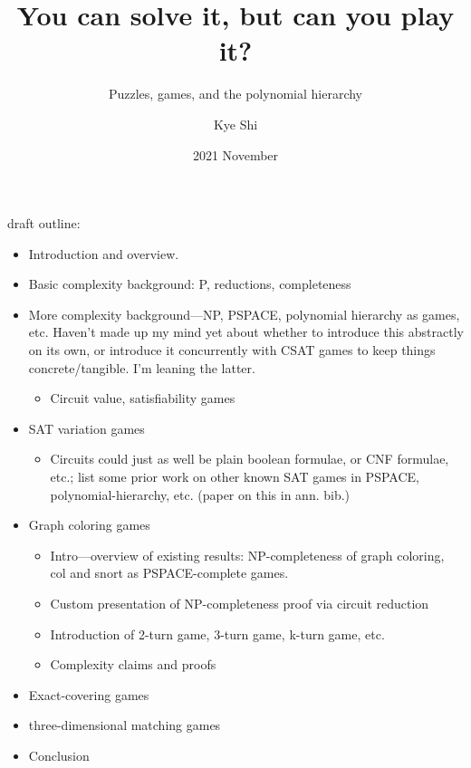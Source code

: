 \documentclass{final-report}
\title{You can solve it, but can you play it?}
\subtitle{Puzzles, games, and the polynomial hierarchy}
\author{Kye Shi}
\date{2021 November}
\begin{document}
\frontmatter
\maketitle
\tableofcontents

draft outline:

\begin{itemize}
  \item Introduction and overview.
  \item Basic complexity background: P, reductions, completeness
  \item More complexity background---NP, PSPACE, polynomial hierarchy as games,
    etc. Haven't made up my mind yet about whether to introduce this abstractly
    on its own, or introduce it concurrently with CSAT games to keep things
    concrete/tangible.  I'm leaning the latter.
    \begin{itemize}
      \item Circuit value, satisfiability games
    \end{itemize}
  \item SAT variation games
    \begin{itemize}
      \item Circuits could just as well be plain boolean formulae, or CNF
        formulae, etc.; list some prior work on other known SAT games in
        PSPACE, polynomial-hierarchy, etc.  (paper on this in ann. bib.)
    \end{itemize}
  \item Graph coloring games
    \begin{itemize}
      \item Intro---overview of existing results: NP-completeness of graph
        coloring, col and snort as PSPACE-complete games.
      \item Custom presentation of NP-completeness proof via circuit reduction
      \item Introduction of 2-turn game, 3-turn game, k-turn game, etc.
      \item Complexity claims and proofs
    \end{itemize}
  \item Exact-covering games
  \item three-dimensional matching games
  \item Conclusion %
\end{itemize}


\mainmatter




%
%
%
%

\printbibliography[heading=bibnumbered]
\end{document}
